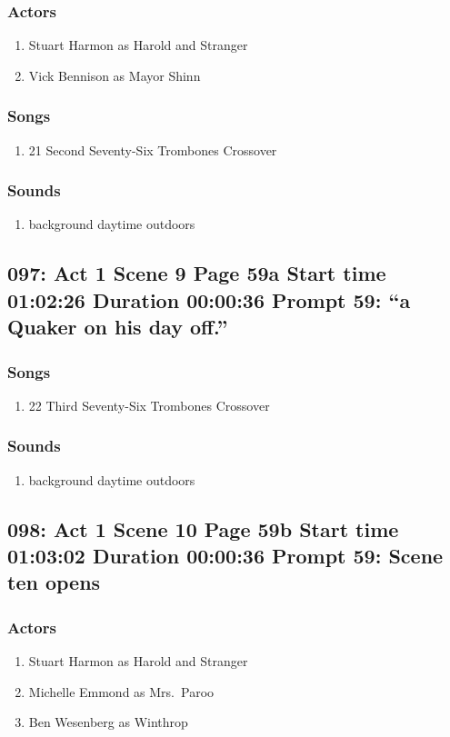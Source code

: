 \subsubsection{Actors}
\begin{enumerate}
\item Stuart Harmon as Harold and Stranger
\item Vick Bennison as Mayor Shinn
\end{enumerate}

\subsubsection{Songs}
\begin{enumerate}
\item 21 Second Seventy-Six Trombones Crossover
\end{enumerate}\subsubsection{Sounds}
\begin{enumerate}
\item background daytime outdoors
\end{enumerate}
\subsection{097: Act 1 Scene 9 Page 59a Start time 01:02:26 Duration 00:00:36 Prompt 59: ``a Quaker on his day off.''}
\subsubsection{Songs}
\begin{enumerate}
\item 22 Third Seventy-Six Trombones Crossover
\end{enumerate}\subsubsection{Sounds}
\begin{enumerate}
\item background daytime outdoors
\end{enumerate}
\subsection{098: Act 1 Scene 10 Page 59b Start time 01:03:02 Duration 00:00:36 Prompt 59: Scene ten opens}

\subsubsection{Actors}
\begin{enumerate}
\item Stuart Harmon as Harold and Stranger
\item Michelle Emmond as Mrs.~Paroo
\item Ben Wesenberg as Winthrop
\end{enumerate}

